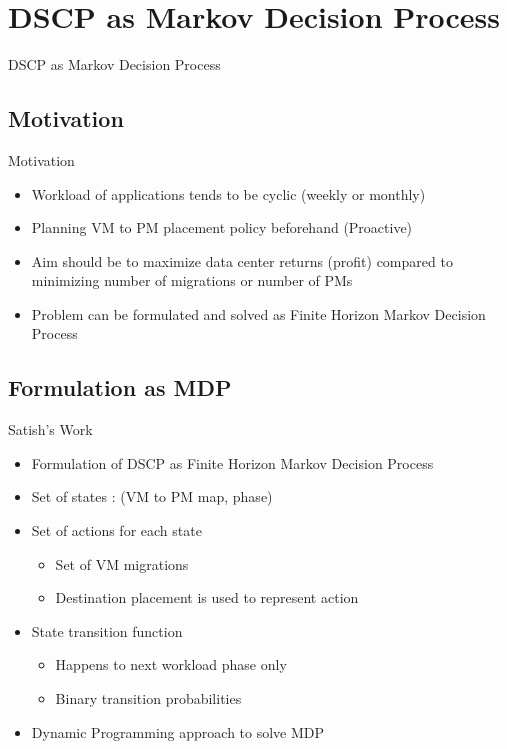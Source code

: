 \documentclass{beamer}
\begin{document}
\section{DSCP as Markov Decision Process}
\begin{frame}{DSCP as Markov Decision Process}
\addtocounter{framenumber}{-1}
\tableofcontents[currentsection]
\end{frame}

\subsection{Motivation}
\begin{frame}{Motivation}
\begin{itemize}
\item Workload of applications tends to be cyclic (weekly or monthly)
\item Planning VM to PM placement policy beforehand (Proactive)
\item Aim should be to maximize data center returns (profit) compared to minimizing number of migrations or number of PMs
\item Problem can be formulated and solved as Finite Horizon Markov Decision Process
\end{itemize}
\end{frame}

\subsection{Formulation as MDP}
\begin{frame}{Satish's Work}
\begin{itemize}
\item Formulation of DSCP as Finite Horizon Markov Decision Process
\item Set of states : (VM to PM map, phase)
\item Set of actions for each state
\begin{itemize}
\item Set of VM migrations
\item Destination placement is used to represent action
\end{itemize}
\item State transition function
\begin{itemize}
\item Happens to next workload phase only
\item Binary transition probabilities
\end{itemize}
\item Dynamic Programming approach to solve MDP
\end{itemize}
\end{frame}
\end{document}
